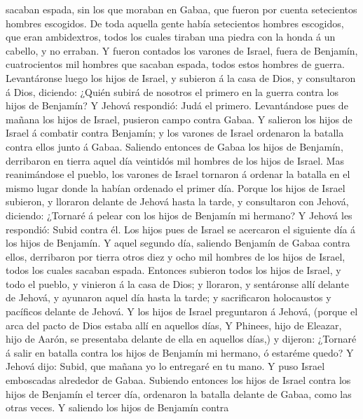 sacaban espada, sin los que moraban en Gabaa, que fueron por cuenta
setecientos hombres escogidos.  De toda aquella gente
había setecientos hombres escogidos, que eran ambidextros, todos los
cuales tiraban una piedra con la honda á un cabello, y no erraban.
 Y fueron contados los varones de Israel, fuera de
Benjamín, cuatrocientos mil hombres que sacaban espada, todos estos
hombres de guerra.  Levantáronse luego los hijos de
Israel, y subieron á la casa de Dios, y consultaron á Dios, diciendo:
¿Quién subirá de nosotros el primero en la guerra contra los hijos de
Benjamín? Y Jehová respondió: Judá el primero. 
Levantándose pues de mañana los hijos de Israel, pusieron campo contra
Gabaa.  Y salieron los hijos de Israel á combatir contra
Benjamín; y los varones de Israel ordenaron la batalla contra ellos
junto á Gabaa.  Saliendo entonces de Gabaa los hijos de
Benjamín, derribaron en tierra aquel día veintidós mil hombres de los
hijos de Israel.  Mas reanimándose el pueblo, los varones
de Israel tornaron á ordenar la batalla en el mismo lugar donde la
habían ordenado el primer día.  Porque los hijos de
Israel subieron, y lloraron delante de Jehová hasta la tarde, y
consultaron con Jehová, diciendo: ¿Tornaré á pelear con los hijos de
Benjamín mi hermano? Y Jehová les respondió: Subid contra él.
 Los hijos pues de Israel se acercaron el siguiente día á
los hijos de Benjamín.  Y aquel segundo día, saliendo
Benjamín de Gabaa contra ellos, derribaron por tierra otros diez y ocho
mil hombres de los hijos de Israel, todos los cuales sacaban espada.
 Entonces subieron todos los hijos de Israel, y todo el
pueblo, y vinieron á la casa de Dios; y lloraron, y sentáronse allí
delante de Jehová, y ayunaron aquel día hasta la tarde; y sacrificaron
holocaustos y pacíficos delante de Jehová.  Y los hijos
de Israel preguntaron á Jehová, (porque el arca del pacto de Dios estaba
allí en aquellos días,  Y Phinees, hijo de Eleazar, hijo
de Aarón, se presentaba delante de ella en aquellos días,) y dijeron:
¿Tornaré á salir en batalla contra los hijos de Benjamín mi hermano, ó
estaréme quedo? Y Jehová dijo: Subid, que mañana yo lo entregaré en tu
mano.  Y puso Israel emboscadas alrededor de Gabaa.
 Subiendo entonces los hijos de Israel contra los hijos
de Benjamín el tercer día, ordenaron la batalla delante de Gabaa, como
las otras veces.  Y saliendo los hijos de Benjamín contra
